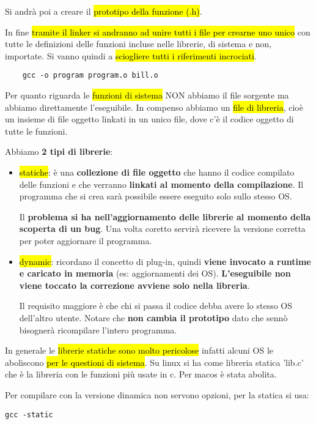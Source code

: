 Si andrà poi a creare il \hl{prototipo della funzione (.h)}.

In fine \hl{tramite il linker si andranno ad unire tutti i file per crearne uno unico} con tutte le definizioni delle funzioni incluse nelle librerie, di sistema e non, importate. Si vanno quindi a \hl{sciogliere tutti i riferimenti incrociati}.

\begin{lstlisting}
	gcc -o program program.o bill.o
\end{lstlisting}

Per quanto riguarda le \hl{funzioni di sistema} NON abbiamo il file sorgente ma abbiamo direttamente l'eseguibile. In compenso abbiamo un \hl{file di libreria}, cioè un insieme di file oggetto linkati in un unico file, dove c'è il codice oggetto di tutte le funzioni.

Abbiamo \textbf{2 tipi di librerie}:
\begin{itemize}
	\item \hl{statiche}: è una \textbf{collezione di file oggetto} che hanno il codice compilato delle funzioni e che verranno \textbf{linkati al momento della compilazione}. Il programma che si crea sarà possibile essere eseguito solo sullo stesso OS.
		
		Il \textbf{problema si ha nell'aggiornamento delle librerie al momento della scoperta di un bug}. Una volta coretto servirà ricevere la versione corretta per poter aggiornare il programma.
		
	\item \hl{dynamic}: ricordano il concetto di plug-in, quindi \textbf{viene invocato a runtime e caricato in memoria} (es: aggiornamenti dei OS). \textbf{L'eseguibile non viene toccato la correzione avviene solo nella libreria}.
	
		Il requisito maggiore è che chi si passa il codice debba avere lo stesso OS dell'altro utente. Notare che \textbf{non cambia il prototipo} dato che sennò bisognerà ricompilare l'intero programma.
\end{itemize}


In generale le \hl{librerie statiche sono molto pericolose} infatti alcuni OS le aboliscono \hl{per le questioni di sistema}. Su linux si ha come libreria statica 'lib.c' che è la libreria con le funzioni più usate in c. Per macos è stata abolita.

Per compilare con la versione dinamica non servono opzioni, per la statica si usa:

\begin{lstlisting}
gcc -static
\end{lstlisting}


